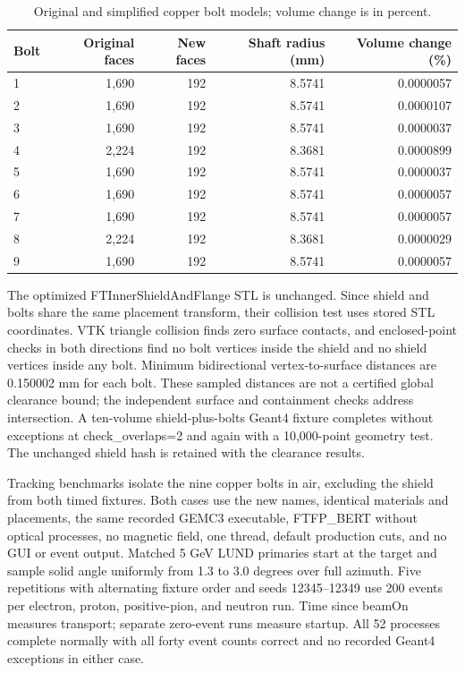 \begin{table}[htbp]
\centering
\caption{Original and simplified copper bolt models; volume change is in percent.}
\label{tab:bolts-meshes}
\begin{tabular}{lrrrr}
\toprule
Bolt & Original faces & New faces & Shaft radius (mm) & Volume change (\%) \\
\midrule
1 & 1,690 & 192 & 8.5741 & 0.0000057 \\
2 & 1,690 & 192 & 8.5741 & 0.0000107 \\
3 & 1,690 & 192 & 8.5741 & 0.0000037 \\
4 & 2,224 & 192 & 8.3681 & 0.0000899 \\
5 & 1,690 & 192 & 8.5741 & 0.0000037 \\
6 & 1,690 & 192 & 8.5741 & 0.0000057 \\
7 & 1,690 & 192 & 8.5741 & 0.0000057 \\
8 & 2,224 & 192 & 8.3681 & 0.0000029 \\
9 & 1,690 & 192 & 8.5741 & 0.0000057 \\
\bottomrule
\end{tabular}
\end{table}

The optimized FTInnerShieldAndFlange STL is unchanged. Since shield and bolts share the same placement
transform, their collision test uses stored STL coordinates. VTK triangle collision finds zero surface
contacts, and enclosed-point checks in both directions find no bolt vertices inside the shield and no shield
vertices inside any bolt. Minimum bidirectional vertex-to-surface distances are 0.150002 mm for each bolt.
These sampled distances are not a certified global clearance bound; the independent surface and containment
checks address intersection. A ten-volume shield-plus-bolts Geant4 fixture completes without exceptions at
check\_overlaps=2 and again with a 10,000-point geometry test. The unchanged shield hash is retained with
the clearance results.

Tracking benchmarks isolate the nine copper bolts in air, excluding the shield from both timed fixtures.
Both cases use the new names, identical materials and placements, the same recorded GEMC3 executable,
FTFP\_BERT without optical processes, no magnetic field, one thread, default production cuts, and no GUI or
event output. Matched 5 GeV LUND primaries start at the target and sample solid angle uniformly from 1.3 to
3.0 degrees over full azimuth. Five repetitions with alternating fixture order and seeds 12345--12349 use
200 events per electron, proton, positive-pion, and neutron run. Time since beamOn measures transport;
separate zero-event runs measure startup. All 52 processes complete normally with all forty event counts
correct and no recorded Geant4 exceptions in either case.

